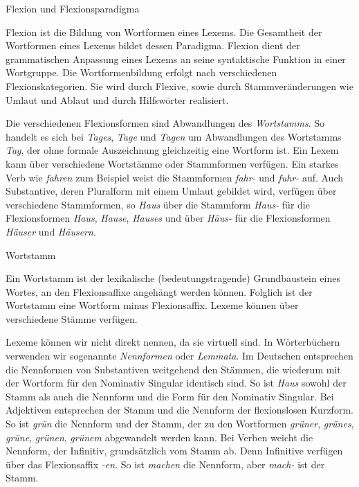 \begin{Definition}{Flexion und Flexionsparadigma}
    
\noindent Flexion ist die Bildung von Wortformen eines Lexems. Die Gesamtheit der Wortformen eines Lexems bildet dessen Paradigma. Flexion dient der grammatischen Anpassung eines Lexems an seine syntaktische Funktion in einer Wortgruppe. Die Wortformenbildung erfolgt nach verschiedenen Flexionskategorien. Sie wird durch Flexive, sowie durch Stammveränderungen wie Umlaut und Ablaut und durch Hilfswörter realisiert. 
\end{Definition}


Die verschiedenen Flexionsformen sind Abwandlungen des \textit{Wortstamms}. So handelt es sich bei \textit{Tages}, \textit{Tage} und \textit{Tagen} um Abwandlungen des Wortstamms \textit{Tag}, der ohne formale Auszeichnung gleichzeitig eine Wortform ist. Ein Lexem kann über verschiedene Wortstämme oder Stammformen verfügen. Ein starkes Verb wie \textit{fahren} zum Beispiel weist die Stammformen \textit{fahr-} und \textit{fuhr-} auf. Auch Substantive, deren Pluralform mit einem Umlaut gebildet wird, verfügen über verschiedene Stammformen, so \zB \textit{Haus} über die Stammform \textit{Haus-} für die Flexionsformen \textit{Haus}, \textit{Hause}, \textit{Hauses} und über \textit{Häus-} für die Flexionsformen \textit{Häuser} und \textit{Häusern}. 

\begin{Definition}{Wortstamm}\label{def:Wortstamm}
    
\noindent 
Ein Wortstamm ist der lexikalische (bedeutungstragende) Grundbaustein eines Wortes, an den Flexionsaffixe angehängt werden können. Folglich ist der Wortstamm eine Wortform minus Flexionsaffix. Lexeme können über verschiedene Stämme verfügen.  
\end{Definition}


Lexeme können wir nicht direkt nennen, da sie virtuell sind. In Wörterbüchern verwenden wir sogenannte \textit{Nennformen} oder \textit{Lemmata}. Im Deutschen entsprechen die Nennformen von Substantiven weitgehend den Stämmen, die wiederum mit der Wortform für den Nominativ Singular identisch sind. So ist \zB \textit{Haus} sowohl der Stamm als auch die Nennform und die Form für den Nominativ Singular. Bei Adjektiven entsprechen der Stamm und die Nennform der flexionslosen Kurzform. So ist \zB \textit{grün} die Nennform und der Stamm, der zu den Wortformen \textit{grüner}, \textit{grünes}, \textit{grüne}, \textit{grünen}, \textit{grünem} abgewandelt werden kann. Bei Verben weicht die Nennform, der Infinitiv, grundsätzlich vom Stamm ab. Denn Infinitive verfügen über das Flexionsaffix \textit{-en}. So ist \zB \textit{machen} die Nennform, aber \textit{mach-} ist der Stamm.  

